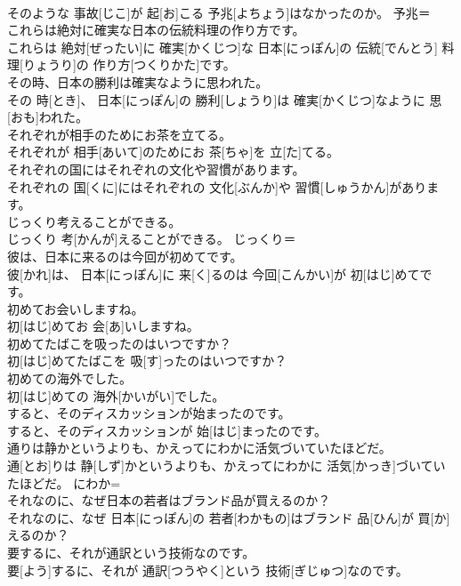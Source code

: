 \documentclass[8pt]{extreport}
\begin{document}
\begin{CJK}{UTF8}{min}
\\	そのような 事故[じこ]が 起[お]こる 予兆[よちょう]はなかったのか。	予兆＝ 
\\	これらは絶対に確実な日本の伝統料理の作り方です。	
\\	これらは 絶対[ぜったい]に 確実[かくじつ]な 日本[にっぽん]の 伝統[でんとう] 料理[りょうり]の 作り方[つくりかた]です。	
\\	その時、日本の勝利は確実なように思われた。	
\\	その 時[とき]、 日本[にっぽん]の 勝利[しょうり]は 確実[かくじつ]なように 思[おも]われた。	
\\	それぞれが相手のためにお茶を立てる。	
\\	それぞれが 相手[あいて]のためにお 茶[ちゃ]を 立[た]てる。	
\\	それぞれの国にはそれぞれの文化や習慣があります。	
\\	それぞれの 国[くに]にはそれぞれの 文化[ぶんか]や 習慣[しゅうかん]があります。	
\\	じっくり考えることができる。	
\\	じっくり 考[かんが]えることができる。	じっくり＝ 
\\	彼は、日本に来るのは今回が初めてです。	
\\	彼[かれ]は、 日本[にっぽん]に 来[く]るのは 今回[こんかい]が 初[はじ]めてです。	
\\	初めてお会いしますね。	
\\	初[はじ]めてお 会[あ]いしますね。	
\\	初めてたばこを吸ったのはいつですか？	
\\	初[はじ]めてたばこを 吸[す]ったのはいつですか？	
\\	初めての海外でした。	
\\	初[はじ]めての 海外[かいがい]でした。	
\\	すると、そのディスカッションが始まったのです。	
\\	すると、そのディスカッションが 始[はじ]まったのです。	
\\	通りは静かというよりも、かえってにわかに活気づいていたほどだ。	
\\	通[とお]りは 静[しず]かというよりも、かえってにわかに 活気[かっき]づいていたほどだ。	にわか= 
\\	それなのに、なぜ日本の若者はブランド品が買えるのか？	
\\	それなのに、なぜ 日本[にっぽん]の 若者[わかもの]はブランド 品[ひん]が 買[か]えるのか？	
\\	要するに、それが通訳という技術なのです。	
\\	要[よう]するに、それが 通訳[つうやく]という 技術[ぎじゅつ]なのです。	

\end{CJK}
\end{document}
